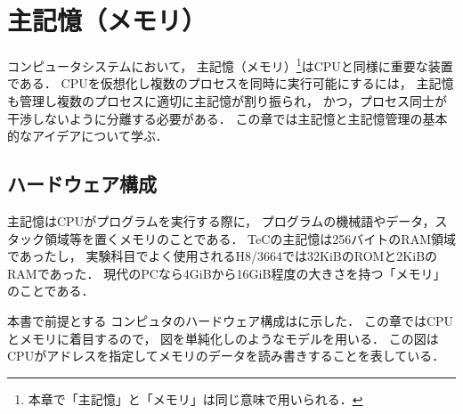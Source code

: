 \chapter{主記憶（メモリ）}
コンピュータシステムにおいて，
主記憶（メモリ）\footnote{
  本章で「主記憶」と「メモリ」は同じ意味で用いられる．
}はCPUと同様に重要な装置である．
CPUを仮想化し複数のプロセスを同時に実行可能にするには，
主記憶も管理し複数のプロセスに適切に主記憶が割り振られ，
かつ，プロセス同士が干渉しないように分離する必要がある．
この章では主記憶と主記憶管理の基本的なアイデアについて学ぶ．

\section{ハードウェア構成}
主記憶はCPUがプログラムを実行する際に，
プログラムの機械語やデータ，スタック領域等を置くメモリのことである．
TeCの主記憶は256バイトのRAM領域であったし，
実験科目でよく使用されるH8/3664では32KiBのROMと2KiBのRAMであった．
現代のPCなら4GiBから16GiB程度の大きさを持つ「メモリ」のことである．

本書で前提とする
コンピュタのハードウェア構成はに示した．
この章ではCPUとメモリに着目するので，
図を単純化しのようなモデルを用いる．
この図はCPUがアドレスを指定してメモリのデータを読み書きすることを表している．

